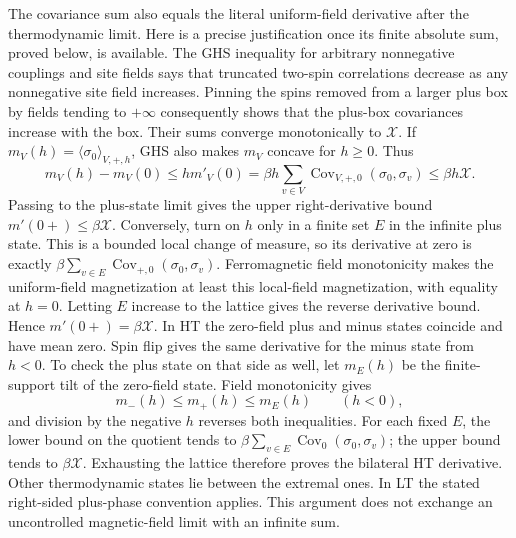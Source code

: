 \documentclass[11pt]{article}
\numberwithin{equation}{section}
\theoremstyle{definition}
\begin{document}
The covariance sum also equals the literal uniform-field derivative after
the thermodynamic limit. Here is a precise justification once its finite
absolute sum, proved below, is available. The GHS inequality for arbitrary
nonnegative couplings and site fields \cite[Theorem 1.5]{CGN} says that
truncated two-spin correlations decrease as any nonnegative site field
increases. Pinning the spins removed from a larger plus box by fields
tending to $+\infty$ consequently shows that the plus-box covariances
increase with the box. Their sums converge monotonically to $\mathcal X$.
If $m_V(h)=\langle\sigma_0\rangle_{V,+,h}$, GHS also makes $m_V$
concave for $h\ge0$. Thus
\[
 m_V(h)-m_V(0)\le h m'_V(0)
 =\beta h\sum_{v\in V}\operatorname{Cov}_{V,+,0}(\sigma_0,\sigma_v)
 \le\beta h\mathcal X.
\]
Passing to the plus-state limit gives the upper right-derivative bound
$m'(0+)\le\beta\mathcal X$. Conversely, turn on $h$ only in a finite
set $E$ in the infinite plus state. This is a bounded local change of
measure, so its derivative at zero is exactly
$\beta\sum_{v\in E}\operatorname{Cov}_{+,0}(\sigma_0,\sigma_v)$.
Ferromagnetic field monotonicity makes the uniform-field magnetization
at least this local-field magnetization, with equality at $h=0$.
Letting $E$ increase to the lattice gives the reverse derivative bound.
Hence $m'(0+)=\beta\mathcal X$. In HT the zero-field plus and minus
states coincide and have mean zero. Spin flip gives the same derivative
for the minus state from $h<0$. To check the plus state on that side as
well, let $m_E(h)$ be the finite-support tilt of the zero-field state.
Field monotonicity gives
\[
 m_-(h)\le m_+(h)\le m_E(h)\qquad(h<0),
\]
and division by the negative $h$ reverses both inequalities. For each
fixed $E$, the lower bound on the quotient tends to
$\beta\sum_{v\in E}\operatorname{Cov}_0(\sigma_0,\sigma_v)$;
the upper bound tends to $\beta\mathcal X$. Exhausting the lattice
therefore proves the bilateral HT derivative. Other thermodynamic states
lie between the extremal ones. In LT the stated right-sided plus-phase
convention applies. This argument does not exchange an uncontrolled
magnetic-field limit with an infinite sum.
\end{document}
